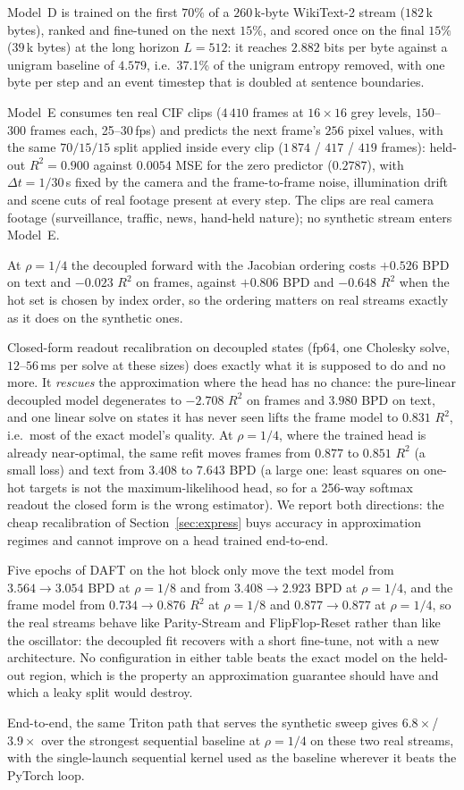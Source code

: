 Model~D is trained on the first $70\%$ of a $260$\,k-byte WikiText-2 stream ($182$\,k bytes), ranked and fine-tuned on the next $15\%$, and scored once on the final $15\%$ ($39$\,k bytes) at the long horizon $L=512$: it reaches $2.882$ bits per byte against a unigram baseline of $4.579$, i.e.\ 37.1\% of the unigram entropy removed, with one byte per step and an event timestep that is doubled at sentence boundaries.

Model~E consumes ten real CIF clips ($4\,410$ frames at $16\times16$ grey levels, $150$--$300$ frames each, 25--30\,fps) and predicts the next frame's $256$ pixel values, with the same $70/15/15$ split applied inside every clip ($1\,874$ / $417$ / $419$ frames): held-out $R^2=0.900$ against $0.0054$ MSE for the zero predictor ($0.2787$), with $\Delta t=1/30$\,s fixed by the camera and the frame-to-frame noise, illumination drift and scene cuts of real footage present at every step. The clips are real camera footage (surveillance, traffic, news, hand-held nature); no synthetic stream enters Model~E.

At $\rho=1/4$ the decoupled forward with the Jacobian ordering costs $+0.526$ BPD on text and $-0.023$ $R^2$ on frames, against $+0.806$ BPD and $-0.648$ $R^2$ when the hot set is chosen by index order, so the ordering matters on real streams exactly as it does on the synthetic ones.

Closed-form readout recalibration on decoupled states (fp64, one Cholesky solve, $12$--$56$\,ms per solve at these sizes) does exactly what it is supposed to do and no more. It \emph{rescues} the approximation where the head has no chance: the pure-linear decoupled model degenerates to $-2.708$ $R^2$ on frames and $3.980$ BPD on text, and one linear solve on states it has never seen lifts the frame model to $0.831$ $R^2$, i.e.\ most of the exact model's quality. At $\rho=1/4$, where the trained head is already near-optimal, the same refit moves frames from $0.877$ to $0.851$ $R^2$ (a small loss) and text from $3.408$ to $7.643$ BPD (a large one: least squares on one-hot targets is not the maximum-likelihood head, so for a 256-way softmax readout the closed form is the wrong estimator). We report both directions: the cheap recalibration of Section~\ref{sec:express} buys accuracy in approximation regimes and cannot improve on a head trained end-to-end.

Five epochs of DAFT on the hot block only move the text model from $3.564\to3.054$ BPD at $\rho=1/8$ and from $3.408\to2.923$ BPD at $\rho=1/4$, and the frame model from $0.734\to0.876$ $R^2$ at $\rho=1/8$ and $0.877\to0.877$ at $\rho=1/4$, so the real streams behave like Parity-Stream and FlipFlop-Reset rather than like the oscillator: the decoupled fit recovers with a short fine-tune, not with a new architecture. No configuration in either table beats the exact model on the held-out region, which is the property an approximation guarantee should have and which a leaky split would destroy.

End-to-end, the same Triton path that serves the synthetic sweep gives $6.8\times$/$3.9\times$ over the strongest sequential baseline at $\rho=1/4$ on these two real streams, with the single-launch sequential kernel used as the baseline wherever it beats the PyTorch loop.
